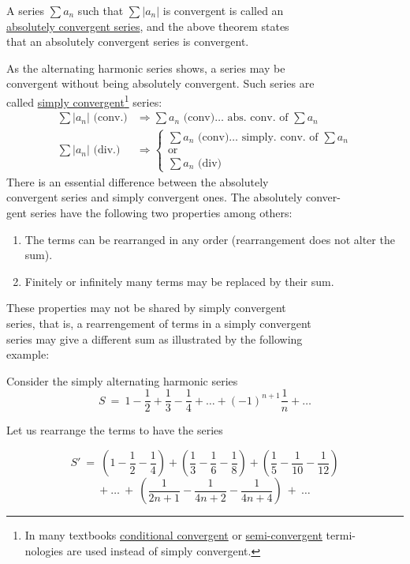 \documentclass[11pt]{amsbook}
\begin{document}

A series $\sum a_{n}$ such that $\sum|a_{n}|$ is convergent is called an
\\\underline{absolutely convergent series}, and the above theorem states \\that an absolutely convergent series is convergent.

As the alternating harmonic series shows, a series may be
\\convergent without being absolutely convergent. Such series are
\\called \underline{simply convergent}\footnote{In many textbooks \underline{conditional convergent} or \underline{semi-convergent} termi-
\\nologies are used instead of simply convergent.} series:
\begin{align*}
    \sum|a_{n}| \text{ (conv.)} 
        &\Longrightarrow \sum a_{n} \text{ (conv)} \dots \text{ abs. conv. of  } \sum a_{n}\\
    \sum|a_{n}| \text{ (div.)} 
        &\Longrightarrow \left\{
            \begin{array}{ll}
             \sum a_{n} \text{ (conv)} \dots \text{ simply. conv. of  } \sum a_{n}\\
             \text{or}\\
             \sum a_{n} \text{ (div)} 
    \end{array}
    \right.    
\end{align*}
There is an essential difference between the absolutely
\\convergent series and simply convergent ones. The absolutely conver-
\\gent series have the following two properties among others:

\begin{enumerate}
    \item The terms can be rearranged in any order (rearrangement does not alter the sum).
    \item Finitely or infinitely many terms may be replaced by their sum.
\end{enumerate}

These properties may not be shared by simply convergent 
\\series, that is, a rearrengement of terms in a simply convergent
\\series may give a different sum as illustrated by the following
\\example:

Consider the simply alternating harmonic series
\[
    S\:=\: 1 - \frac{1}{2} + \frac{1}{3} - \frac{1}{4} + \dots + (-1)^{n+1} \frac{1}{n} + \dots
\]

Let us rearrange the terms to have the series 

\[
    S'\:=\:(1-\frac{1}{2} - \frac{1}{4})+(\frac{1}{3} - \frac{1}{6} - \frac{1}{8}) +(\frac{1}{5} - \frac{1}{10} - \frac{1}{12})
\]
\[
    + \:\dots\:+\:(\frac{1}{2n+1} - \frac{1}{4n+2} -\frac{1}{4n+4} ) \:+\:\dots 
\]

\end{document}

